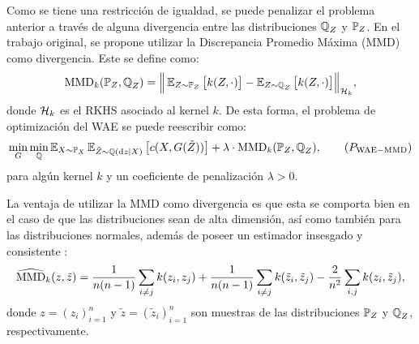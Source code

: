 Como se tiene una restricción de igualdad, se puede penalizar el problema anterior a través de alguna divergencia entre las distribuciones $\ProbQ_Z$ y $\Prob_Z$. En el trabajo original, se propone utilizar la Discrepancia Promedio Máxima (MMD) \cite{gretton2006kernel} como divergencia. Este se define como:
\begin{equation}
    \MMDOp_k(\Prob_Z, \ProbQ_Z) = \Big\|
    \Exp_{Z\sim\Prob_Z} \qty\big[ k(Z, \cdot) ] - \Exp_{Z\sim\ProbQ_Z} \qty\big[ k(Z, \cdot) ]
    \Big\|_{\cH_k},
\end{equation}
donde $\mathcal{H}_k$ es el RKHS asociado al kernel $k$. De esta forma, el problema de optimización del WAE se puede reescribir como:
\begin{equation}

    \min_{G} \min_{\ProbQ} \Exp_{X\sim\Prob_X} \Exp_{\tilde Z\sim\ProbQ(\dd z \mid X)} \qty\big[ c(X, G(\tilde Z)) ] + \lambda \cdot \MMDOp_{k}(\Prob_Z, \ProbQ_Z),\tag{$P_{\mathrm{WAE-MMD}}$}

\end{equation}
para algún kernel $k$ y un coeficiente de penalización $\lambda > 0$.

La ventaja de utilizar la MMD como divergencia es que esta se comporta bien en el caso de que las distribuciones sean de alta dimensión, así como también para las distribuciones normales, además de poseer un estimador insesgado y consistente \cite{gretton2012kernel}:
\begin{equation}
    \widehat {\operatorname{MMD}}_k(z, \tilde z)
    = \frac{1}{n(n-1)} \sum_{i\neq j} k(z_i, z_j)
    + \frac{1}{n(n-1)} \sum_{i\neq j} k(\tilde z_i, \tilde z_j)
    - \frac{2}{n^2} \sum_{i, j} k(z_i, \tilde z_j),
\end{equation}
donde $z = (z_i)_{i=1}^{n}$ y $\tilde z = (\tilde z_i)_{i=1}^{n}$ son muestras de las distribuciones $\Prob_Z$ y $\ProbQ_Z$, respectivamente.

